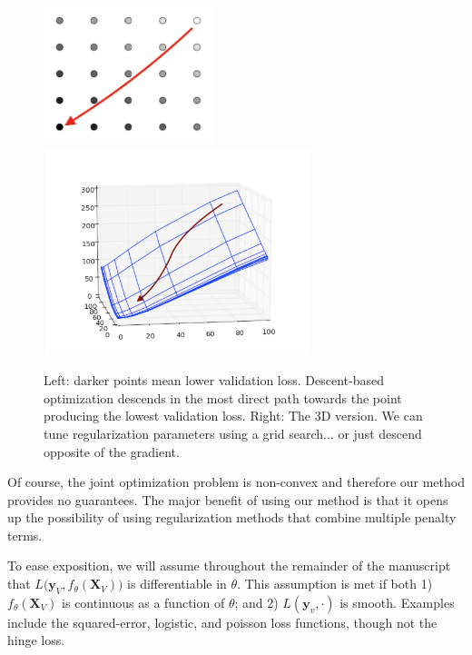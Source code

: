 \documentclass[10pt,letterpaper]{article}
\begin{document}
\begin{figure}
\begin{center}
\includegraphics[height=40mm]{grid_search_vs_descent.png}
\includegraphics[height=60mm]{surface_in_regularization_parameters.png}
\end{center}
\caption{Left: darker points mean lower validation loss. Descent-based optimization descends in the most direct path towards the point producing the lowest validation loss. Right: The 3D version. We can tune regularization parameters using a grid search... or just descend opposite of the gradient.}
\label{fig:compare}
\end{figure}

Of course, the joint optimization problem is non-convex and therefore our method provides no guarantees. The major benefit of using our method is that it opens up the possibility of using regularization methods that combine multiple penalty terms.

To ease exposition, we will assume throughout the remainder of the manuscript that $L \Big( \boldsymbol{y}_V, f_{\theta}(\boldsymbol{X}_V)\Big)$ is differentiable in $\theta$. This assumption is met if both 1) $f_{\theta}(\boldsymbol{X}_V)$ is continuous as a function of $\theta$; and 2) $L\left(\boldsymbol{y}_v,\cdot\right)$ is smooth. Examples include the squared-error, logistic, and poisson loss functions, though not the hinge loss.
\end{document}
